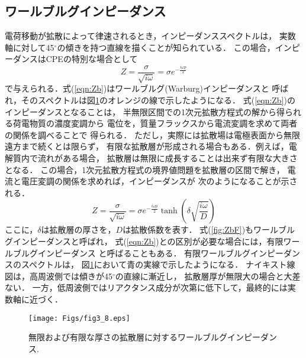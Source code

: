 \subsection{ワールブルグインピーダンス}
電荷移動が拡散によって律速されるとき，インピーダンススペクトルは，
実数軸に対して45$^\circ$の傾きを持つ直線を描くことが知られている．
この場合，インピーダンスはCPEの特別な場合として
\begin{equation}
	Z=\frac{\sigma}{\sqrt{i\omega}}=\sigma e^{-\frac{i\omega p}{2}}
	\label{eqn:Zb}
\end{equation}
で与えられる．式(\ref{eqn:Zb})はワールブルグ(Warburg)インピーダンスと
呼ばれ，そのスペクトルは図\ref{fig:fig3_8}のオレンジの線で示したようになる．
式(\ref{eqn:Zb})のインピーダンスとなることは，
半無限区間での1次元拡散方程式の解から得られる荷電物質の濃度変調から
電位を，質量フラックスから電流変調を求めて両者の関係を調べることで
得られる．
ただし，実際には拡散場は電極表面から無限遠方まで続くとは限らず，
有限な拡散層が形成される場合もある．例えば，電解質内で流れがある場合，
拡散層は無限に成長することは出来ず有限な大きさとなる．
この場合，1次元拡散方程式の境界値問題を拡散層の区間で解き，
電流と電圧変調の関係を求めれば，インピーダンスが
次のようになることが示される．
\begin{equation}
	Z=\frac{\sigma}{\sqrt{i\omega}}=\sigma e^{-\frac{i\omega p}{2}}
	\tanh \left( \delta \sqrt{\frac{i\omega}{D}}\right)
	\label{eqn:ZbF}
\end{equation}
ここに，$\delta$は拡散層の厚さを，$D$は拡散係数を表す．
式(\ref{fig:ZbF})もワールブルグインピーダンスと呼ばれ，
式(\ref{eqn:Zb})との区別が必要な場合には，有限ワールブルグインピーダンス
と呼ばることもある．
有限ワールブルグインピーダンスのスペクトルは，
図\ref{fig:fig3_8}において青の実線で示したようになる．
ナイキスト線図は，高周波側では傾きが45$^\circ$の直線に漸近し，
拡散層厚が無限大の場合と大差ない．
一方，低周波側ではリアクタンス成分が次第に低下して，最終的には実数軸に近づく．
\begin{figure}[h]
	\begin{center}
	\texttt{[image: Figs/fig3\_8.eps]} 
	\end{center}
	\caption{
		無限および有限な厚さの拡散層に対するワールブルグインピーダンス.
	} 
	\label{fig:fig3_8}
\end{figure}
